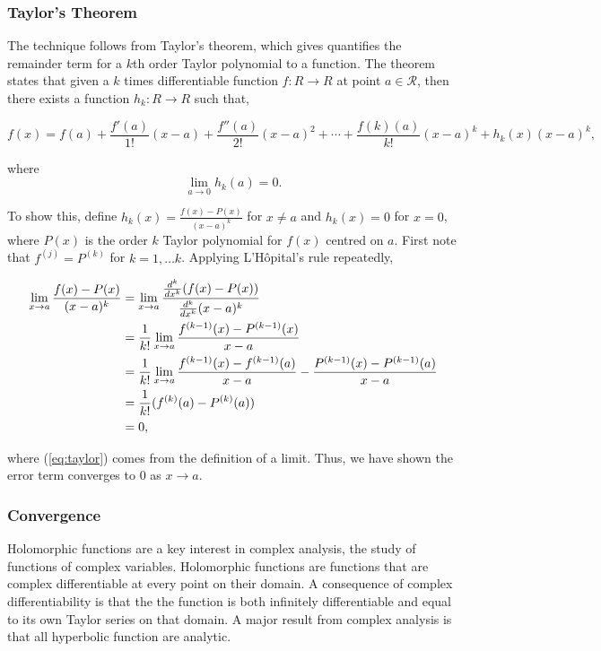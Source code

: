 \documentclass[11pt]{amsart}
\begin{document}
\subsubsection{Taylor's Theorem}

The technique follows from Taylor's theorem, which gives quantifies the remainder term for a $k$th order Taylor polynomial to a function. The theorem states that given a $k$ times differentiable function $f : R \to R$ at point $a \in \mathcal{R}$, then there exists a function $h_k : R \to R$ such that,

$$f(x) = f(a) + \frac{f'(a)}{1!}(x - a) + \frac{f''(a)}{2!}(x - a)^2 + \cdots  + \frac{f(k)(a)}{k!}(x - a)^k + h_k(x)(x - a)^k,$$

where $$\lim_{a \to 0}h_k(a) = 0.$$

To show this, define $h_k(x) = \frac{f(x) - P(x)}{(x - a)^k}$ for $x \neq a$ and $h_k(x) = 0$ for $x = 0$, where $P(x)$ is the order $k$ Taylor polynomial for $f(x)$ centred on $a$. First note that $f^{(j)} = P^{(k)}$ for $k = 1, \dots k$. Applying L'H\^{o}pital's rule repeatedly,

\begin{align}
\lim_{x \to a} \frac{f(x) - P(x)}{(x - a)^k} &= \lim_{x \to a} \frac{\frac{d^k}{dx^k}(f(x) - P(x))}{\frac{d^k}{dx^k}(x - a)^k} \notag \\
&= \frac{1}{k!}\lim_{x \to a} \frac{f^{(k-1)}(x) - P^{(k-1)}(x)}{x - a} \notag \\
&= \frac{1}{k!}\lim_{x \to a} \frac{f^{(k-1)}(x) - f^{(k-1)}(a)}{x - a} - \frac{P^{(k-1)}(x) - P^{(k-1)}(a)}{x - a} \notag \\
&= \frac{1}{k!}(f^{(k)}(a) - P^{(k)}(a)) \label{eq:taylor} \\
&= 0, \notag
\end{align}

where (\ref{eq:taylor}) comes from the definition of a limit. Thus, we have shown the error term converges to 0 as $x \to a$.

\subsubsection{Convergence}

Holomorphic functions are a key interest in complex analysis, the study of functions of complex variables. Holomorphic functions are functions that are complex differentiable at every point on their domain. A consequence of complex differentiability is that the the function is both infinitely differentiable and equal to its own Taylor series on that domain. A major result from complex analysis is that all hyperbolic function are analytic.
\end{document}
